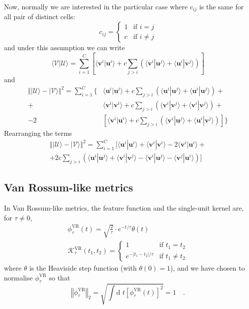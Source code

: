 \documentclass[11pt,a4paper]{article}
\newcommand{\dif}{\textrm{d }\!}
\newcommand{\norm}[1]{\left\Vert #1 \right\Vert}
\newcommand{\abs}[1]{\left\vert #1 \right\vert}
\newcommand{\ket}[1]{|#1\rangle}
\newcommand{\braket}[2]{\langle #1|#2 \rangle}
\newcommand{\cU}{\mathcal{U}}
\newcommand{\cV}{\mathcal{V}}
\newcommand{\bu}{\boldsymbol{u}}
\newcommand{\bv}{\boldsymbol{v}}
\begin{document}
Now, normally we are interested in the particular case where $c_{ij}$ is
the same for all pair of distinct cells:
\begin{equation*}
c_{ij} = \begin{cases}
  1 & \textrm{if } i=j\\
  c & \textrm{if } i\neq j
\end{cases}
\end{equation*}
and under this assumption we can write
\begin{equation}
  \label{eq:multiprod_constant_c}
  \braket{\cV}{\cU} = \sum_{i=1}^C\left[\braket{\bv^i}{\bu^i} + c\sum_{j>i}\left(\braket{\bv^i}{\bu^j} + \braket{\bu^i}{\bv^j} \right) \right]
\end{equation}
and
\begin{equation}
  \begin{split}
    \norm{\ket{\cU} - \ket{\cV}}^2 =
    \sum_{i=1}^C\Bigg\{&\braket{\bu^i}{\bu^i} +
    c\sum_{j>i}\left(\braket{\bu^i}{\bu^j} + \braket{\bu^i}{\bu^j}
    \right) +\\
    +&\braket{\bv^i}{\bv^i} + c\sum_{j>i}\left(\braket{\bv^i}{\bv^j} +
      \braket{\bv^i}{\bv^j} \right) + \\
    -2&\left[\braket{\bv^i}{\bu^i} +
      c\sum_{j>i}\left(\braket{\bv^i}{\bu^j} + \braket{\bu^i}{\bv^j}
      \right)\right] \Bigg\}
  \end{split}
\end{equation}  
Rearranging the terms 
\begin{multline} 
  \label{eq:multidist_constant_c}
  \norm{\ket{\cU} - \ket{\cV}}^2 =
  \sum_{i=1}^C\Bigg[\braket{\bu^i}{\bu^i} + \braket{\bv^i}{\bv^i}
  - 2 \braket{\bv^i}{\bu^i} + \\
  + 2c\sum_{j>i}\left(\braket{\bu^i}{\bu^j} + \braket{\bv^i}{\bv^j}
    -\braket{\bv^i}{\bu^j} - \braket{\bv^j}{\bu^i}\right)\Bigg]
\end{multline}
  
\subsection{Van Rossum-like metrics} In Van Rossum-like
metrics, the feature function and the single-unit kernel are, for
$\tau\neq 0$,
\begin{gather*}
\phi^{\textrm{VR}}_{\tau}(t) = \sqrt{\frac{2}{\tau}}\cdot e^{-t/\tau}\theta(t) \\
\mathcal{K}^{\textrm{VR}}_{\tau}(t_1,t_2) = \begin{cases}
  1 & \textrm{if } t_1=t_2\\
  e^{-\abs{t_1-t_2}/\tau} & \textrm{if } t_1\neq t_2
\end{cases}
\end{gather*}
where $\theta$ is the Heaviside step function (with $\theta(0)=1$),
and we have chosen to normalise $\phi^{\textrm{VR}}_{\tau}$ so that
\begin{equation*}
\norm{\phi^{\textrm{VR}}_{\tau}}_2 = \sqrt{\int\dif t \left[\phi^{\textrm{VR}}_{\tau}(t)\right]^2} = 1 \quad.
\end{equation*}
\end{document}
